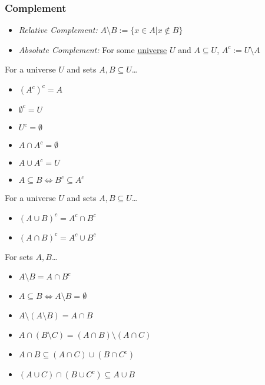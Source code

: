 \subsubsection{Complement}\label{complement}
\begin{itemize}
  \item \emph{Relative Complement:} $A \ensuremath{\setminus} B := \{x \in A | x \not\in B \}$
  \item \emph{Absolute Complement:} For some \hyperref[universe]{universe} $U$ and $A \subseteq U$, $A^{c} := U \ensuremath{\setminus} A$
\end{itemize}

\begin{proposition}
For a universe $U$ and sets $A,B \subseteq U$\dots
\begin{itemize}
  \item $(A^c)^c = A$
  \item $\emptyset^c = U$
  \item $U^c = \emptyset$
  \item $A \cap A^c = \emptyset$
  \item $A \cup A^c = U$
  \item $A \subseteq B \Leftrightarrow B^c \subseteq A^c$ 
\end{itemize} 
\end{proposition}

\begin{proposition}
For a universe $U$ and sets $A,B \subseteq U$\dots
\begin{itemize}
  \item $(A \cup B)^c = A^c \cap B^c$
  \item $(A \cap B)^c = A^c \cup B^c$
\end{itemize} 
\end{proposition}

\begin{proposition}
For sets $A,B$\dots
\begin{itemize}
  \item $A \setminus B = A \cap B^c$
  \item $A \subseteq B \Leftrightarrow A \setminus B = \emptyset$
  \item $A \setminus (A \setminus B) = A \cap B$
  \item $A \cap (B \setminus C) = (A \cap B) \setminus (A \cap C)$
  \item $A \cap B \subseteq (A \cap C) \cup (B \cap C^c)$
  \item $(A \cup C) \cap (B \cup C^c) \subseteq A \cup B$
\end{itemize}
\end{proposition}

